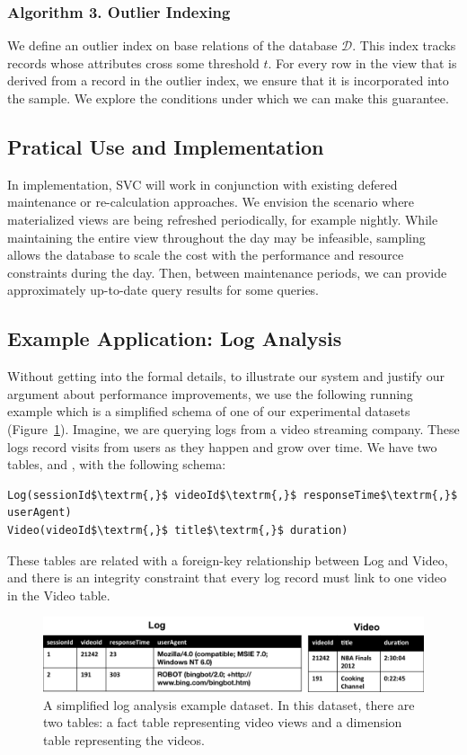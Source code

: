 \subsubsection{Algorithm 3. Outlier Indexing}
We define an outlier index on base relations of the database $\mathcal{D}$.
This index tracks records whose attributes cross some threshold $t$.
For every row in the view that is derived from a record in the outlier index, we ensure that it is incorporated into the sample.
We explore the conditions under which we can make this guarantee.

\subsection{Pratical Use and Implementation}
In implementation, SVC will work in conjunction with existing defered maintenance or re-calculation approaches.
We envision the scenario where materialized views are being refreshed periodically, for example nightly.
While maintaining the entire view throughout the day may be infeasible, sampling allows the database to scale the cost with the performance and resource constraints during the day.
Then, between maintenance periods, we can provide approximately up-to-date query results for some queries.

\subsection{Example Application: Log Analysis}
Without getting into the formal details, to illustrate our system and justify our argument about performance improvements, we use the following running example which is a 
simplified schema of one of our experimental datasets (Figure~\ref{example-1}).
Imagine, we are querying logs from a video streaming company. 
These logs record visits from users as they happen and grow over time.
We have two tables,  and , with the following schema:

\begin{lstlisting}[mathescape]
Log(sessionId$\textrm{,}$ videoId$\textrm{,}$ responseTime$\textrm{,}$ userAgent)
Video(videoId$\textrm{,}$ title$\textrm{,}$ duration)
\end{lstlisting}
These tables are related with a foreign-key relationship between
Log and Video, and there is an integrity constraint that every log
record must link to one video in the Video table.

\begin{figure}[ht!] 
\centering
\vspace{-0.75em}
 \includegraphics[width=\columnwidth]{figs/sample-clean-example.png}\vspace{-0.25em}
 \caption{A simplified log analysis example dataset. In this dataset, there are two tables: a fact table representing video views and a dimension table representing the videos.\label{example-1}}
\end{figure}

